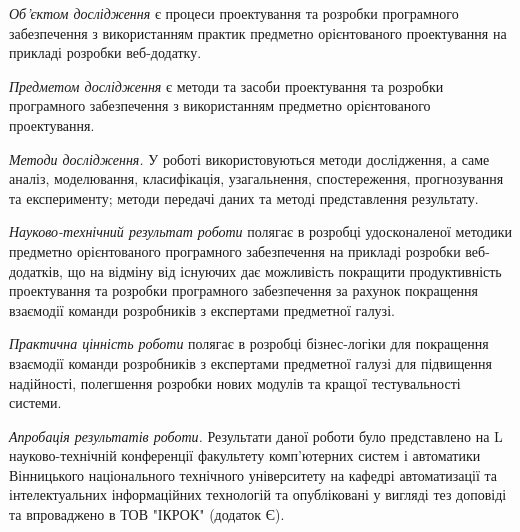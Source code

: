 \emph{Об'єктом дослідження} є процеси проектування та розробки
програмного забезпечення з використанням практик 
предметно орієнтованого проектування на прикладі розробки веб-додатку.

\emph{Предметом дослідження} є методи та засоби проектування та
розробки програмного забезпечення з використанням предметно орієнтованого проектування.

\emph{Методи дослідження.} У роботі використовуються методи дослідження, а
саме аналіз, моделювання, класифікація, узагальнення, спостереження,
прогнозування та експерименту; методи передачі даних та методі
представлення результату.

\emph{Науково-технічний результат роботи} полягає в розробці удосконаленої
методики предметно орієнтованого програмного забезпечення на прикладі
розробки веб-додатків, що на відміну від існуючих дає можливість
покращити продуктивність проектування та розробки програмного 
забезпечення за рахунок покращення взаємодії команди розробників
з експертами предметної галузі. 

\emph{Практична цінність роботи} полягає в розробці бізнес-логіки
для покращення взаємодії команди розробників з експертами
предметної галузі для підвищення надійності, полегшення розробки
нових модулів та кращої тестувальності системи.

\emph{Апробація результатів роботи.} Результати даної роботи було
представлено на L науково-технічній конференції
факультету комп'ютерних систем і автоматики 
Вінницького національного технічного університету на
кафедрі автоматизації та інтелектуальних інформаційних технологій
та опубліковані у вигляді тез доповіді \cite{thesis} та впроваджено в ТОВ "ІКРОК" (додаток Є).
